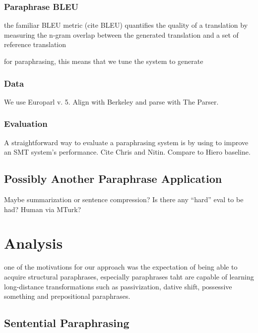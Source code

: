 \documentclass[11pt]{article}
\begin{document}
\subsubsection{Paraphrase BLEU} \label{pp_bleu}

the familiar BLEU metric (cite BLEU) quantifies the quality of a
translation by measuring the n-gram overlap between the generated
translation and a set of  reference translation

for paraphrasing, this means that we tune the system to generate


\subsubsection{Data} \label{data}

We use Europarl v. 5. Align with Berkeley and parse with The Parser.

\subsubsection{Evaluation} \label{evaluation}

A straightforward way to evaluate a paraphrasing system is by using to
improve an SMT system's performance. Cite Chris and Nitin. Compare to
Hiero baseline.

\subsection{Possibly Another Paraphrase
  Application} \label{other_application}

Maybe summarization or sentence compression? Is there
any ``hard'' eval to be had? Human via MTurk?

\newpage

\section{Analysis} \label{analysis}

one of the motivations for our approach was the expectation of being
able to acquire structural paraphrases, especially paraphrases taht
are capable of learning long-distance transformations such as
passivization, dative shift, possessive something and prepositional
paraphrases.

\subsection{Sentential Paraphrasing} \label{sentential_paraphrasing}
\end{document}
